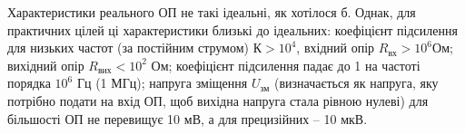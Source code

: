 Характеристики реального ОП не такі ідеальні, як хотілося б. Однак, для
практичних цілей ці характеристики близькі до ідеальних: коефіцієнт
підсилення для низьких частот (за постійним струмом) $К > 10^4$, вхідний опір $R_{вх} > 10^6 Ом$; вихідний опір $R_{вих} < 10^2$ Ом; коефіцієнт підсилення падає до 1 на частоті порядка $10^6$
Гц (1 МГц); напруга зміщення $U_{зм}$ (визначається як напруга,
яку потрібно подати на вхід ОП, щоб вихідна напруга стала рівною нулеві) для
більшості ОП не перевищує 10 мВ, а для прецизійних – 10 мкВ.
